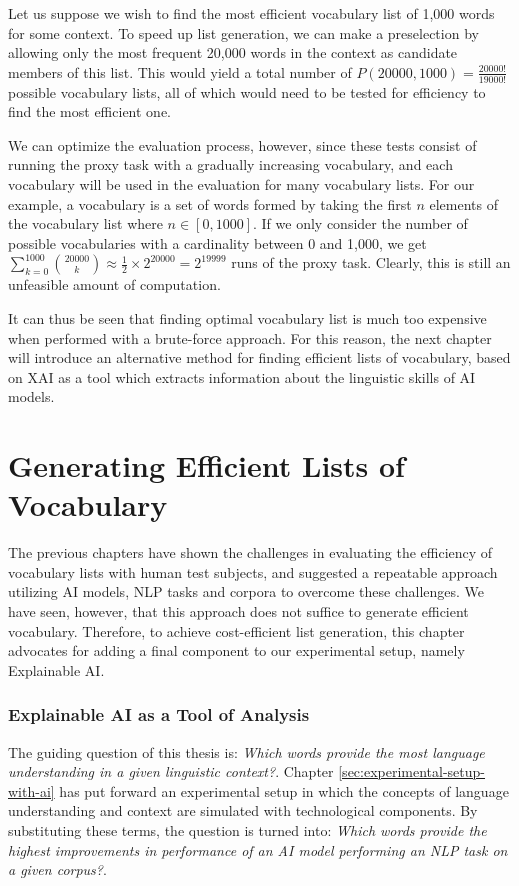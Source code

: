 Let us suppose we wish to find the most efficient vocabulary list of 1,000 words for some context.
To speed up list generation, we can make a preselection by allowing only the most frequent 20,000 words in the context as candidate members of this list.
This would yield a total number of $P(20000, 1000) = \frac{20000!}{19000!}$ possible vocabulary lists, all of which would need to be tested for efficiency to find the most efficient one.

We can optimize the evaluation process, however, since these tests consist of running the proxy task with a gradually increasing vocabulary, and each vocabulary will be used in the evaluation for many vocabulary lists.
For our example, a vocabulary is a set of words formed by taking the first $n$ elements of the vocabulary list where $n \in [0, 1000]$.
If we only consider the number of possible vocabularies with a cardinality between 0 and 1,000, we get
$
	\sum_{k=0}^{1000} \binom{20000}{k} \approx \frac{1}{2} \times 2^{20000} = 2^{19999}
$ runs of the proxy task. Clearly, this is still an unfeasible amount of computation.

It can thus be seen that finding optimal vocabulary list is much too expensive when performed with a brute-force approach.
For this reason, the next chapter will introduce an alternative method for finding efficient lists of vocabulary, based on XAI as a tool which extracts information about the linguistic skills of AI models.

\section{Generating Efficient Lists of Vocabulary} \label{sec:list-generation}

The previous chapters have shown the challenges in evaluating the efficiency of vocabulary lists with human test subjects, and suggested a repeatable approach utilizing AI models, NLP tasks and corpora to overcome these challenges.
We have seen, however, that this approach does not suffice to generate efficient vocabulary.
Therefore, to achieve cost-efficient list generation, this chapter advocates for adding a final component to our experimental setup, namely Explainable AI.

\subsubsection{Explainable AI as a Tool of Analysis} \label{sec:xai-as-tools-of-analysis}
The guiding question of this thesis is:
\textit{Which words provide the most language understanding in a given linguistic context?}.
Chapter \ref{sec:experimental-setup-with-ai} has put forward an experimental setup in which the concepts of language understanding and context are simulated with technological components.
By substituting these terms, the question is turned into:
\textit{Which words provide the highest improvements in performance of an AI model performing an NLP task on a given corpus?}.

